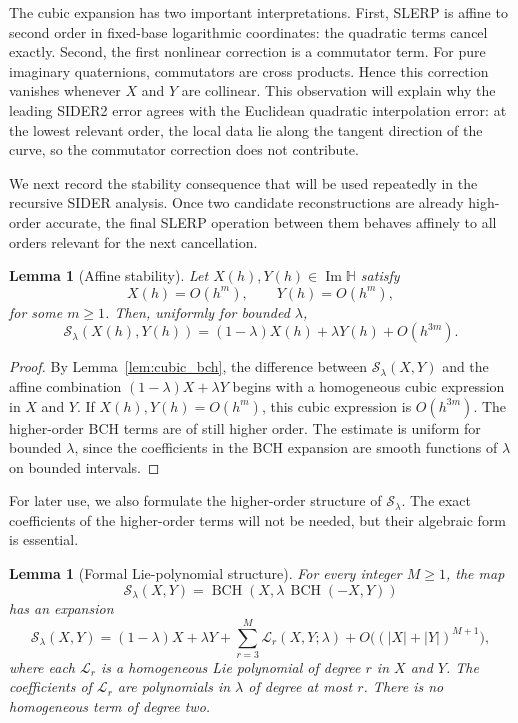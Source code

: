 \documentclass[a4paper,11pt]{article}
\newcommand{\bH}{\mathbb{H}}
\newcommand{\BCH}{\operatorname{BCH}}
\newcommand{\ImH}{\operatorname{Im}\bH}
\numberwithin{equation}{section}
\theoremstyle{plain}
\newtheorem{lemma}[thm]{Lemma}
\theoremstyle{definition}
\theoremstyle{remark}
\begin{document}
The cubic expansion has two important interpretations.  First, SLERP is affine
to second order in fixed-base logarithmic coordinates: the quadratic terms
cancel exactly.  Second, the first nonlinear correction is a commutator term.
For pure imaginary quaternions, commutators are cross products.  Hence this
correction vanishes whenever \(X\) and \(Y\) are collinear.  This observation
will explain why the leading SIDER2 error agrees with the Euclidean quadratic
interpolation error: at the lowest relevant order, the local data lie along the
tangent direction of the curve, so the commutator correction does not
contribute.

We next record the stability consequence that will be used repeatedly in the
recursive SIDER analysis.  Once two candidate reconstructions are already
high-order accurate, the final SLERP operation between them behaves affinely to
all orders relevant for the next cancellation.

\begin{lemma}[Affine stability]
\label{lem:q_affine_stability}
Let \(X(h),Y(h)\in\ImH\) satisfy
\[
        X(h)=O(h^m),
        \qquad
        Y(h)=O(h^m),
\]
for some \(m\geq1\).  Then, uniformly for bounded \(\lambda\),
\[
        \mathcal S_\lambda(X(h),Y(h))
        =
        (1-\lambda)X(h)+\lambda Y(h)+O(h^{3m}).
\]
\end{lemma}

\begin{proof}
By Lemma~\ref{lem:cubic_bch}, the difference between
\(\mathcal S_\lambda(X,Y)\) and the affine combination
\((1-\lambda)X+\lambda Y\) begins with a homogeneous cubic expression in
\(X\) and \(Y\).  If \(X(h),Y(h)=O(h^m)\), this cubic expression is
\(O(h^{3m})\).  The higher-order BCH terms are of still higher order.  The
estimate is uniform for bounded \(\lambda\), since the coefficients in the BCH
expansion are smooth functions of \(\lambda\) on bounded intervals.
\end{proof}

For later use, we also formulate the higher-order structure of
\(\mathcal S_\lambda\).  The exact coefficients of the higher-order terms will
not be needed, but their algebraic form is essential.

\begin{lemma}[Formal Lie-polynomial structure]
\label{lem:q_formal_structure}
For every integer \(M\geq1\), the map
\[
        \mathcal S_\lambda(X,Y)
        =
        \BCH\!\left(X,\lambda\,\BCH(-X,Y)\right)
\]
has an expansion
\[
        \mathcal S_\lambda(X,Y)
        =
        (1-\lambda)X+\lambda Y
        +
        \sum_{r=3}^{M}\mathcal L_r(X,Y;\lambda)
        +
        O\bigl((|X|+|Y|)^{M+1}\bigr),
\]
where each \(\mathcal L_r\) is a homogeneous Lie polynomial of degree \(r\) in
\(X\) and \(Y\).  The coefficients of \(\mathcal L_r\) are polynomials in
\(\lambda\) of degree at most \(r\).  There is no homogeneous term of degree
two.
\end{lemma}
\end{document}
